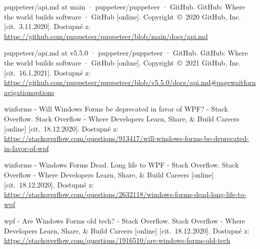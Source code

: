 \begin{thebibliography}{99}
 puppeteer/api.md at main · puppeteer/puppeteer · GitHub. GitHub: Where the world builds software · GitHub [online]. Copyright~©~2020 GitHub, Inc. [cit.~3.11.2020]. Dostupné z: \url{https://github.com/puppeteer/puppeteer/blob/main/docs/api.md}

 puppeteer/api.md at v5.5.0 · puppeteer/puppeteer · GitHub. GitHub: Where the world builds software · GitHub [online]. Copyright~©~2021 GitHub, Inc. [cit.~16.1.2021]. Dostupné z: \url{https://github.com/puppeteer/puppeteer/blob/v5.5.0/docs/api.md#pagewaitfornavigationoptions}

 winforms - Will Windows Forms be deprecated in favor of WPF? - Stack Overflow. Stack Overflow - Where Developers Learn, Share, \& Build Careers [online] [cit.~18.12.2020]. Dostupné z: \url{https://stackoverflow.com/questions/913417/will-windows-forms-be-deprecated-in-favor-of-wpf}

 winforms - Windows Forms Dead. Long life to WPF - Stack Overflow. Stack Overflow - Where Developers Learn, Share, \& Build Careers [online] [cit.~18.12.2020]. Dostupné z: \url{https://stackoverflow.com/questions/2632118/windows-forms-dead-long-life-to-wpf}

 wpf - Are Windows Forms old tech? - Stack Overflow. Stack Overflow - Where Developers Learn, Share, \& Build Careers [online] [cit.~18.12.2020]. Dostupné z: \url{https://stackoverflow.com/questions/1916510/are-windows-forms-old-tech}


\end{thebibliography}
\newpage